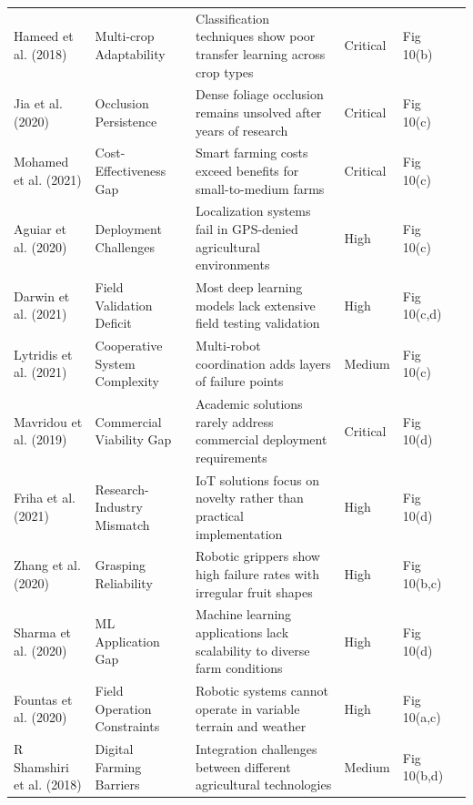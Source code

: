 \documentclass{ieeeaccess}
\begin{document}
\begin{table}[htbp]
\begin{tabular}{p{}p{}p{}p{}p{}p{}}
Hameed et al. (2018) & Multi-crop Adaptability & Classification techniques show poor transfer learning across crop types & Critical & Fig 10(b) & \cite{hameed2018comprehensive} \\

Jia et al. (2020) & Occlusion Persistence & Dense foliage occlusion remains unsolved after years of research & Critical & Fig 10(c) & \cite{jia2020apple} \\

Mohamed et al. (2021) & Cost-Effectiveness Gap & Smart farming costs exceed benefits for small-to-medium farms & Critical & Fig 10(c) & \cite{mohamed2021smart} \\

Aguiar et al. (2020) & Deployment Challenges & Localization systems fail in GPS-denied agricultural environments & High & Fig 10(c) & \cite{aguiar2020localization} \\

Darwin et al. (2021) & Field Validation Deficit & Most deep learning models lack extensive field testing validation & High & Fig 10(c,d) & \cite{darwin2021recognition} \\

Lytridis et al. (2021) & Cooperative System Complexity & Multi-robot coordination adds layers of failure points & Medium & Fig 10(c) & \cite{lytridis2021overview} \\

Mavridou et al. (2019) & Commercial Viability Gap & Academic solutions rarely address commercial deployment requirements & Critical & Fig 10(d) & \cite{mavridou2019machine} \\

Friha et al. (2021) & Research-Industry Mismatch & IoT solutions focus on novelty rather than practical implementation & High & Fig 10(d) & \cite{friha2021internet} \\

Zhang et al. (2020) & Grasping Reliability & Robotic grippers show high failure rates with irregular fruit shapes & High & Fig 10(b,c) & \cite{zhang2020state} \\

Sharma et al. (2020) & ML Application Gap & Machine learning applications lack scalability to diverse farm conditions & High & Fig 10(d) & \cite{sharma2020machine} \\

Fountas et al. (2020) & Field Operation Constraints & Robotic systems cannot operate in variable terrain and weather & High & Fig 10(a,c) & \cite{fountas2020agricultural} \\

R Shamshiri et al. (2018) & Digital Farming Barriers & Integration challenges between different agricultural technologies & Medium & Fig 10(b,d) & \cite{r2018research} \\

\bottomrule
\end{tabular}
\end{table}
\end{document}
